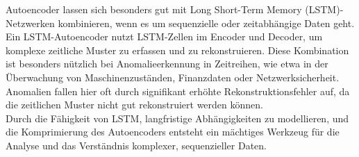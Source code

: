 \documentclass[a4paper,12pt]{article}
\begin{document}
	Autoencoder lassen sich besonders gut mit Long Short-Term Memory (LSTM)-Netzwerken kombinieren, wenn es um sequenzielle oder zeitabhängige Daten geht. 
	\\[0.5em]
	Ein LSTM-Autoencoder nutzt LSTM-Zellen im Encoder und Decoder, um komplexe zeitliche Muster zu erfassen und zu rekonstruieren. Diese Kombination ist besonders nützlich bei Anomalieerkennung in Zeitreihen, wie etwa in der Überwachung von Maschinenzuständen, Finanzdaten oder Netzwerksicherheit. Anomalien fallen hier oft durch signifikant erhöhte Rekonstruktionsfehler auf, da die zeitlichen Muster nicht gut rekonstruiert werden können.
	\\[0.5em]
	Durch die Fähigkeit von LSTM, langfristige Abhängigkeiten zu modellieren, und die Komprimierung des Autoencoders entsteht ein mächtiges Werkzeug für die Analyse und das Verständnis komplexer, sequenzieller Daten.
	
\end{document}

